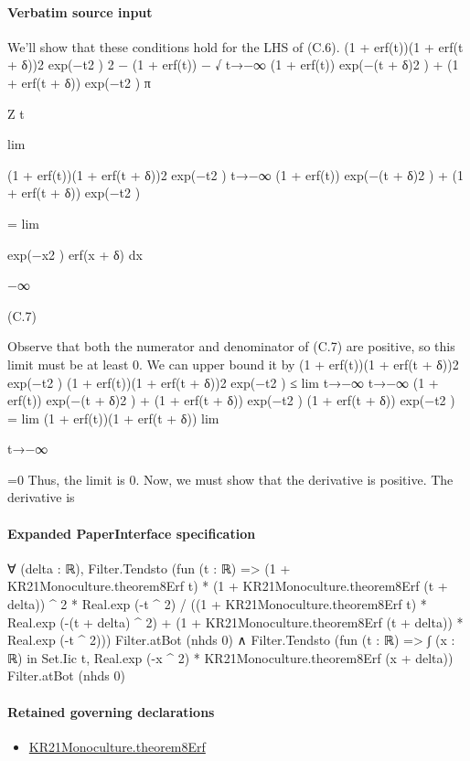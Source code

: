 \documentclass[10pt]{article}
\begin{document}
\paragraph{Verbatim source input}
\begin{ReviewVerbatim}
We’ll show that these conditions hold for the LHS of (C.6).
(1 + erf(t))(1 + erf(t + δ))2 exp(−t2 )
2
− (1 + erf(t)) − √
t→−∞ (1 + erf(t)) exp(−(t + δ)2 ) + (1 + erf(t + δ)) exp(−t2 )
π

Z t

lim

(1 + erf(t))(1 + erf(t + δ))2 exp(−t2 )
t→−∞ (1 + erf(t)) exp(−(t + δ)2 ) + (1 + erf(t + δ)) exp(−t2 )

= lim

exp(−x2 ) erf(x + δ) dx

−∞

(C.7)

Observe that both the numerator and denominator of (C.7) are positive, so this limit must be at least 0.
We can upper bound it by
(1 + erf(t))(1 + erf(t + δ))2 exp(−t2 )
(1 + erf(t))(1 + erf(t + δ))2 exp(−t2 )
≤
lim
t→−∞
t→−∞ (1 + erf(t)) exp(−(t + δ)2 ) + (1 + erf(t + δ)) exp(−t2 )
(1 + erf(t + δ)) exp(−t2 )
= lim (1 + erf(t))(1 + erf(t + δ))
lim

t→−∞

=0
Thus, the limit is 0. Now, we must show that the derivative is positive. The derivative is
\end{ReviewVerbatim}



\paragraph{Expanded PaperInterface specification}
\begin{ReviewVerbatim}
∀ (delta : ℝ),
  Filter.Tendsto
      (fun (t : ℝ) =>
        (1 + KR21Monoculture.theorem8Erf t) * (1 + KR21Monoculture.theorem8Erf (t + delta)) ^ 2 * Real.exp (-t ^ 2) /
          ((1 + KR21Monoculture.theorem8Erf t) * Real.exp (-(t + delta) ^ 2) +
            (1 + KR21Monoculture.theorem8Erf (t + delta)) * Real.exp (-t ^ 2)))
      Filter.atBot (nhds 0) ∧
    Filter.Tendsto (fun (t : ℝ) => ∫ (x : ℝ) in Set.Iic t, Real.exp (-x ^ 2) * KR21Monoculture.theorem8Erf (x + delta))
      Filter.atBot (nhds 0)
\end{ReviewVerbatim}

\paragraph{Retained governing declarations}
\begin{itemize}\raggedright
\item \hyperlink{paper-prerequisite-89a4972e4c2bbebd}{KR21\allowbreak{}Monoculture.\allowbreak{}theorem8\allowbreak{}Erf}
\end{itemize}
\end{document}
